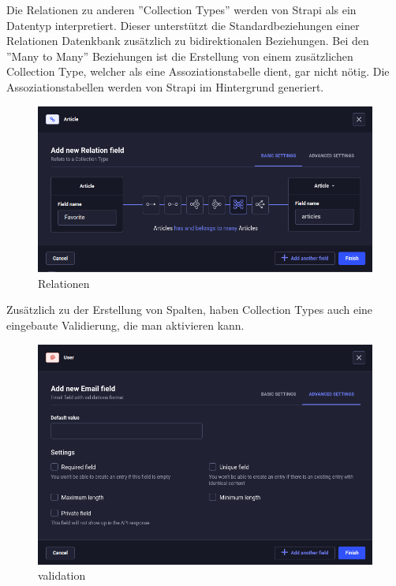 Die Relationen zu anderen ''Collection Types'' werden von Strapi als ein Datentyp interpretiert.
Dieser unterstützt die Standardbeziehungen einer Relationen Datenkbank zusätzlich zu bidirektionalen Beziehungen.
Bei den ''Many to Many'' Beziehungen ist die Erstellung von einem zusätzlichen Collection Type, welcher als eine Assoziationstabelle dient, gar nicht nötig.
Die Assoziationstabellen werden von Strapi im Hintergrund generiert.

\begin{figure}[H]
  \centering
  \includegraphics[width=\textwidth]{./pics/relations}
  \caption{Relationen}
  \label{relations}
\end{figure}

Zusätzlich zu der Erstellung von Spalten, haben Collection Types auch eine eingebaute Validierung, die man aktivieren kann.

\begin{figure}[H]

  \centering
  \includegraphics[width=\textwidth]{./pics/validation.png}
  \caption{validation}
  \label{validation}

\end{figure}

